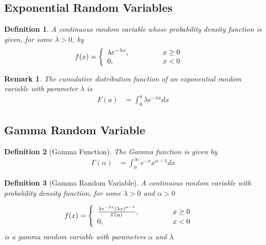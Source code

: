 \documentclass[11pt, oneside]{book}   	%
\newtheorem{definition}{Definition}[chapter]
\newtheorem{remark}{Remark}[chapter]
\begin{document}
\begin{spacing}{1.618}
\subsection{Exponential Random Variables}

\begin{definition}
	A continuous random variable whose probability density function is given, for some $\lambda > 0$, by 
	\begin{alignat}{4}
		f(x)&=\left\{\begin{array}{lll}
			\lambda e^{-\lambda x},&\hspace{1 cm}&x\geq 0 \\
			0,&\hspace{1 cm}&x< 0
		\end{array}\right.
	\end{alignat}
\end{definition}

\begin{remark}
	The cumulative distribution function of an exponential random variable with parameter $\lambda$ is 
	\begin{alignat}{4}
		F(a)&=\int_0^a\lambda e^{-\lambda x} dx
	\end{alignat}
\end{remark}

\subsection{Gamma Random Variable}

\begin{definition}[Gamma Function]
	The Gamma function is given by 
	\begin{alignat}{4}
		\Gamma(\alpha)&=\int_0^\infty e^{-x}x^{\alpha - 1} dx
	\end{alignat}
\end{definition}

\begin{definition}[Gamma Random Variable]
	A continuous random variable with probability density function, for some $\lambda > 0$ and $\alpha > 0$ 
	
	\begin{alignat}{4}
		f(x)&=\left\{\begin{array}{lll}
			\frac{\lambda e^{-\lambda x} (\lambda x)^{\alpha-1}}{\Gamma(\alpha)},&\hspace{1 cm}& x\geq 0 \\
			0,&\hspace{1 cm}& x< 0
		\end{array}\right.
	\end{alignat}
	is a \emph{gamma random variable} with parameters $\alpha$ and $\lambda$
\end{definition}


\end{spacing}
\end{document}
